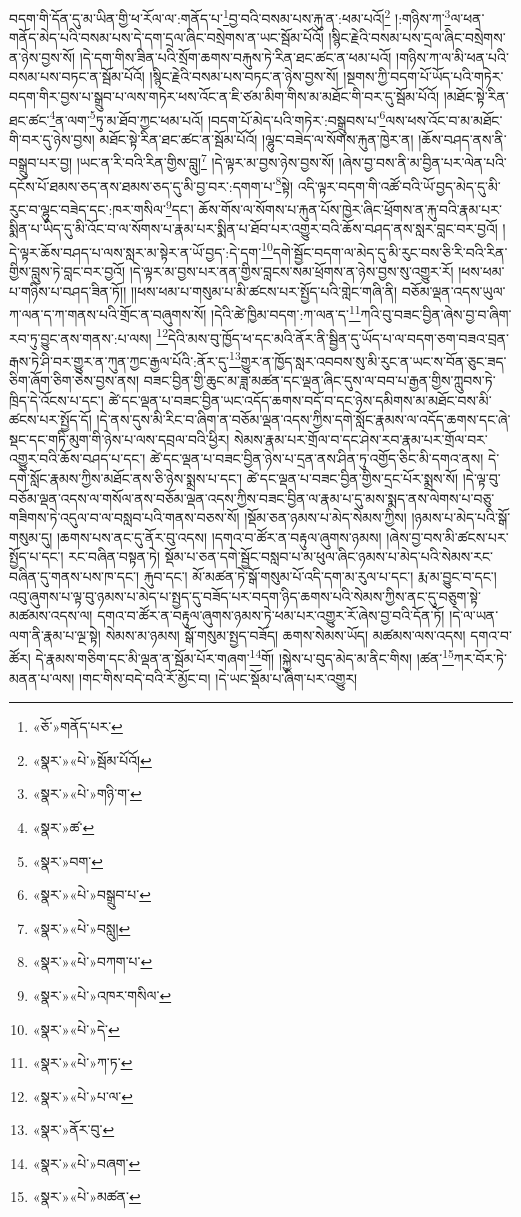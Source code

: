 བདག་གི་དོན་དུ་མ་ཡིན་གྱི་ཕ་རོལ་ལ་:གནོད་པ་\footnote{«ཅོ་»གནོད་པར་}བྱ་བའི་བསམ་པས་རྐུ་ན་:ཕམ་པའོ།\footnote{«སྣར་»«པེ་»སྦོམ་པོའོ།} །:གཉིས་ཀ་\footnote{«སྣར་»«པེ་»གཉི་ག་}ལ་ཕན་གནོད་མེད་པའི་བསམ་པས་དེ་དག་དྲལ་ཞིང་བསྲེགས་ན་ཡང་སྦོམ་པོའོ། །སྙིང་རྗེའི་བསམ་པས་དྲལ་ཞིང་བསྲེགས་ན་ཉེས་བྱས་སོ། །དེ་དག་གིས་ཟིན་པའི་སྲོག་ཆགས་བརྐུས་ཏེ་རིན་ཐང་ཚང་ན་ཕམ་པའོ། །གཉིས་ཀ་ལ་མི་ཕན་པའི་བསམ་པས་བཏང་ན་སྦོམ་པོའོ། །སྙིང་རྗེའི་བསམ་པས་བཏང་ན་ཉེས་བྱས་སོ། །སྔགས་ཀྱི་བདག་པོ་ཡོད་པའི་གཏེར་བདག་གིར་བྱས་པ་སྒྲུབ་པ་ལས་གཏེར་ཕས་འོང་ན་ཇི་ཙམ་མིག་གིས་མ་མཐོང་གི་བར་དུ་སྦོམ་པོའོ། །མཐོང་སྟེ་རིན་ཐང་ཚང་\footnote{«སྣར་»ཚ་}ན་ལག་\footnote{«སྣར་»བག་}ཏུ་མ་ཐོབ་ཀྱང་ཕམ་པའོ། །བདག་པོ་མེད་པའི་གཏེར་:བསྒྲུབས་པ་\footnote{«སྣར་»«པེ་»བསྒྲུབ་པ་}ལས་ཕས་འོང་བ་མ་མཐོང་གི་བར་དུ་ཉེས་བྱས། མཐོང་སྟེ་རིན་ཐང་ཚང་ན་སྦོམ་པོའོ། །ལྷུང་བཟེད་ལ་སོགས་རྐུན་ཁྱེར་ན། །ཆོས་བཤད་ནས་ནི་བསྒྲུབ་པར་བྱ། །ཡང་ན་རི་བའི་རིན་གྱིས་བླུ།\footnote{«སྣར་»«པེ་»བསླུ།} །དེ་ལྟར་མ་བྱས་ཉེས་བྱས་སོ། །ཞེས་བྱ་བས་ནི་མ་བྱིན་པར་ལེན་པའི་དངོས་པོ་ཐམས་ཅད་ནས་ཐམས་ཅད་དུ་མི་བྱ་བར་:དགག་པ་\footnote{«སྣར་»«པེ་»བཀག་པ་}སྟེ། འདི་ལྟར་བདག་གི་འཚོ་བའི་ཡོ་བྱད་མེད་དུ་མི་རུང་བ་ལྷུང་བཟེད་དང་:ཁར་གསིལ་\footnote{«སྣར་»«པེ་»འཁར་གསིལ་}དང་། ཆོས་གོས་ལ་སོགས་པ་རྐུན་པོས་ཁྱེར་ཞིང་ཕྲོགས་ན་རྐུ་བའི་རྣམ་པར་སྨིན་པ་ཡིད་དུ་མི་འོང་བ་ལ་སོགས་པ་རྣམ་པར་སྨིན་པ་ཐོབ་པར་འགྱུར་བའི་ཆོས་བཤད་ནས་སླར་བླང་བར་བྱའོ། །དེ་ལྟར་ཆོས་བཤད་པ་ལས་སླར་མ་སྟེར་ན་ཡོ་བྱད་:དེ་དག་\footnote{«སྣར་»«པེ་»དེ་}དགེ་སྦྱོང་བདག་ལ་མེད་དུ་མི་རུང་བས་ཅི་རི་བའི་རིན་གྱིས་བླུས་ཏེ་བླང་བར་བྱའོ། །དེ་ལྟར་མ་བྱས་པར་ནན་གྱིས་བླངས་སམ་ཕྲོགས་ན་ཉེས་བྱས་སུ་འགྱུར་རོ། །ཕས་ཕམ་པ་གཉིས་པ་བཤད་ཟིན་ཏོ།། །།ཕས་ཕམ་པ་གསུམ་པ་མི་ཚངས་པར་སྤྱོད་པའི་གླེང་གཞི་ནི། བཅོམ་ལྡན་འདས་ཡུལ་ཀ་ལན་ད་ཀ་གནས་པའི་གྲོང་ན་བཞུགས་སོ། །དེའི་ཚེ་ཁྱིམ་བདག་:ཀ་ལན་ད་\footnote{«སྣར་»«པེ་»ཀ་ཏ་}ཀའི་བུ་བཟང་བྱིན་ཞེས་བྱ་བ་ཞིག་རབ་ཏུ་བྱུང་ནས་གནས་:པ་ལས། \footnote{«སྣར་»«པེ་»པ་ལ་}དེའི་མས་བུ་ཁྱོད་ཕ་དང་མའི་ནོར་ནི་སྦྱིན་དུ་ཡོད་པ་ལ་བདག་ཅག་བཟའ་བྲན་རྒས་ཏེ་ཤི་བར་གྱུར་ན་ཀུན་ཀྱང་རྒྱལ་པོའི་:ནོར་དུ་\footnote{«སྣར་»ནོར་བུ་}གྱུར་ན་ཁྱོད་སླར་འབབས་སུ་མི་རུང་ན་ཡང་ས་བོན་ཅུང་ཟད་ཅིག་ཞོག་ཅིག་ཅེས་བྱས་ནས། བཟང་བྱིན་གྱི་ཆུང་མ་ཟླ་མཚན་དང་ལྡན་ཞིང་དུས་ལ་བབ་པ་རྒྱན་གྱིས་ཀླུབས་ཏེ་ཁྲིད་དེ་འོངས་པ་དང་། ཚེ་དང་ལྡན་པ་བཟང་བྱིན་ཡང་འདོད་ཆགས་བདོ་བ་དང་ཉེས་དམིགས་མ་མཐོང་བས་མི་ཚངས་པར་སྤྱོད་དོ། །དེ་ནས་དུས་མི་རིང་བ་ཞིག་ན་བཅོམ་ལྡན་འདས་ཀྱིས་དགེ་སློང་རྣམས་ལ་འདོད་ཆགས་དང་ཞེ་སྡང་དང་གཏི་མུག་གི་ཉེས་པ་ལས་དབྲལ་བའི་ཕྱིར། སེམས་རྣམ་པར་གྲོལ་བ་དང་ཤེས་རབ་རྣམ་པར་གྲོལ་བར་འགྱུར་བའི་ཆོས་བཤད་པ་དང་། ཚེ་དང་ལྡན་པ་བཟང་བྱིན་ཉེས་པ་དྲན་ནས་ཤིན་ཏུ་འགྱོད་ཅིང་མི་དགའ་ནས། དེ་དགེ་སློང་རྣམས་ཀྱིས་མཐོང་ནས་ཅི་ཉེས་སྨྲས་པ་དང་། ཚེ་དང་ལྡན་པ་བཟང་བྱིན་གྱིས་དྲང་པོར་སྨྲས་སོ། །དེ་ལྟ་བུ་བཅོམ་ལྡན་འདས་ལ་གསོལ་ནས་བཅོམ་ལྡན་འདས་ཀྱིས་བཟང་བྱིན་ལ་རྣམ་པ་དུ་མས་སྨད་ནས་ལེགས་པ་བཅུ་གཟིགས་ཏེ་འདུལ་བ་ལ་བསླབ་པའི་གནས་བཅས་སོ། །སྡོམ་ཅན་ཉམས་པ་མེད་སེམས་ཀྱིས། །ཉམས་པ་མེད་པའི་སྒོ་གསུམ་དུ། །ཆགས་པས་ནང་དུ་ནོར་བུ་འདས། །དགའ་བ་ཚོར་ན་བརྟུལ་ཞུགས་ཉམས། །ཞེས་བྱ་བས་མི་ཚངས་པར་སྤྱོད་པ་དང་། རང་བཞིན་བསྟན་ཏེ། སྡོམ་པ་ཅན་དགེ་སྦྱོང་བསླབ་པ་མ་ཕུལ་ཞིང་ཉམས་པ་མེད་པའི་སེམས་རང་བཞིན་དུ་གནས་པས་ཁ་དང་། རྐུབ་དང་། མོ་མཚན་ཏེ་སྒོ་གསུམ་པོ་འདི་དག་མ་རུལ་པ་དང་། རྨ་མ་བྱུང་བ་དང་། འབུ་ཞུགས་པ་ལྟ་བུ་ཉམས་པ་མེད་པ་སྤྱད་དུ་བཟོད་པར་བདག་ཉིད་ཆགས་པའི་སེམས་ཀྱིས་ནང་དུ་བཅུག་སྟེ་མཚམས་འདས་ལ། དགའ་བ་ཚོར་ན་བརྟུལ་ཞུགས་ཉམས་ཏེ་ཕམ་པར་འགྱུར་རོ་ཞེས་བྱ་བའི་དོན་ཏོ། །དེ་ལ་ཡན་ལག་ནི་རྣམ་པ་ལྔ་སྟེ། སེམས་མ་ཉམས། སྒོ་གསུམ་སྤྱད་བཟོད། ཆགས་སེམས་ཡོད། མཚམས་ལས་འདས། དགའ་བ་ཚོར། དེ་རྣམས་གཅིག་དང་མི་ལྡན་ན་སྦོམ་པོར་གཞག་\footnote{«སྣར་»«པེ་»བཞག་}གོ། །སྐྱེས་པ་བུད་མེད་མ་ནིང་གིས། །ཚན་\footnote{«སྣར་»«པེ་»མཚན་}ཀར་བོར་ཏེ་མནན་པ་ལས། །གང་གིས་བདེ་བའི་རོ་མྱོང་བ། །དེ་ཡང་སྡོམ་པ་ཞིག་པར་འགྱུར། 